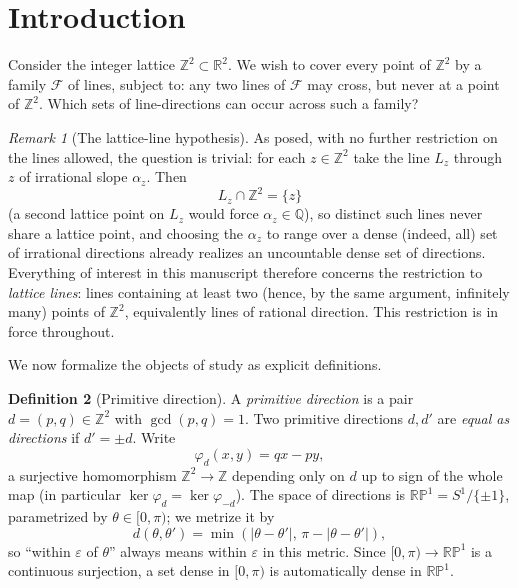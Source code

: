 \documentclass[a4paper,11pt,oneside,reqno]{amsart}
\theoremstyle{definition}
\newtheorem{definition}{Definition}
\theoremstyle{remark}
\newtheorem{remark}[definition]{Remark}
\theoremstyle{plain}
\newcommand{\Z}{\mathbb{Z}}
\newcommand{\R}{\mathbb{R}}
\newcommand{\RP}{\mathbb{RP}^1}
\begin{document}
\section{Introduction}

Consider the integer lattice \(\Z^2\subset\R^2\). We wish to cover every point of \(\Z^2\) by a family
\(\mathcal F\) of lines, subject to: any two lines of \(\mathcal F\) may cross, but never at a point of
\(\Z^2\). Which sets of line-directions can occur across such a family?

\begin{remark}[The lattice-line hypothesis]
  \label{rem:hypothesis}
  As posed, with no further restriction on the lines allowed, the question is trivial: for each
  \(z\in\Z^2\) take the line \(L_z\) through \(z\) of irrational slope \(\alpha_z\). Then
  \begin{equation}
    \label{eq:irrational-line}
    L_z\cap\Z^2=\{z\}
  \end{equation}
  (a second lattice point on \(L_z\) would force \(\alpha_z\in\mathbb Q\)), so distinct such lines
  never share a lattice point, and choosing the \(\alpha_z\) to range over a dense (indeed, all) set of
  irrational directions already realizes an uncountable dense set of directions. Everything of
  interest in this manuscript therefore concerns the restriction to \emph{lattice lines}: lines
  containing at least two (hence, by the same argument, infinitely many) points of \(\Z^2\),
  equivalently lines of rational direction. This restriction is in force throughout.
\end{remark}

We now formalize the objects of study as explicit definitions.

\begin{definition}[Primitive direction]
  \label{def:direction}
  A \emph{primitive direction} is a pair \(d=(p,q)\in\Z^2\) with \(\gcd(p,q)=1\). Two primitive
  directions \(d,d'\) are \emph{equal as directions} if \(d'=\pm d\). Write
  \begin{equation}
    \label{eq:phi-def}
    \varphi_d(x,y) = qx-py,
  \end{equation}
  a surjective homomorphism \(\Z^2\to\Z\) depending only on \(d\) up to sign of the whole map (in
  particular \(\ker\varphi_d=\ker\varphi_{-d}\)). The space of directions is \(\RP=S^1/\{\pm1\}\),
  parametrized by \(\theta\in[0,\pi)\); we metrize it by
  \begin{equation}
    \label{eq:RP-metric}
    d(\theta,\theta') = \min(|\theta-\theta'|,\,\pi-|\theta-\theta'|),
  \end{equation}
  so ``within \(\varepsilon\) of \(\theta\)'' always means within \(\varepsilon\) in this metric. Since
  \([0,\pi)\to\RP\) is a continuous surjection, a set dense in \([0,\pi)\) is automatically dense in
  \(\RP\).
\end{definition}
\end{document}
